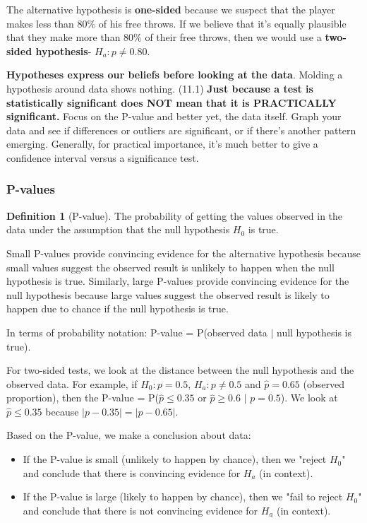 \documentclass[12pt, a4paper]{article}
\theoremstyle{definition}
\newtheorem{definition}{Definition}
\begin{document}
The alternative hypothesis is \textbf{one-sided} because we suspect that the player makes less than 80\% of his free throws. If we believe that it's equally plausible that they make more than 80\% of their free throws, then we would use a \textbf{two-sided hypothesis}- $H_a: p \neq 0.80$.

\textbf{Hypotheses express our beliefs before looking at the data}. Molding a hypothesis around data shows nothing.
(11.1) \textbf{Just because a test is statistically significant does NOT mean that it is PRACTICALLY significant.}
Focus on the P-value and better yet, the data itself.
Graph your data and see if differences or outliers are significant, or if there's another pattern emerging.
Generally, for practical importance, it's much better to give a confidence interval versus a significance test.

\subsubsection{P-values}
\begin{definition}[P-value]
    The probability of getting the values observed in the data under the assumption that the null hypothesis $H_0$ is true.
\end{definition}

Small P-values provide convincing evidence for the alternative hypothesis because small values suggest the observed result is unlikely to happen when the null hypothesis is true.
Similarly, large P-values provide convincing evidence for the null hypothesis because large values suggest the observed result is likely to happen due to chance if the null hypothesis is true.

In terms of probability notation: P-value = P(observed data $|$ null hypothesis is true).

For two-sided tests, we look at the distance between the null hypothesis and the observed data.
For example, if $H_0: p = 0.5$, $H_a: p \neq 0.5$ and $\hat{p} = 0.65$ (observed proportion), then the P-value = P($\hat{p} \leq 0.35$ or $\hat{p} \geq 0.6$ $|$  $p = 0.5$).
We look at $\hat{p} \leq 0.35$ because $|p - 0.35| = |p - 0.65|$.

Based on the P-value, we make a conclusion about data:
\begin{itemize}
    \item If the P-value is small (unlikely to happen by chance), then we "reject $H_0$" and conclude that there is convincing evidence for $H_a$ (in context).
    \item If the P-value is large (likely to happen by chance), then we "fail to reject $H_0$" and conclude that there is not convincing evidence for $H_a$ (in context).
\end{itemize}
\end{document}
